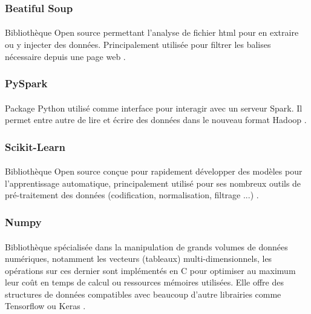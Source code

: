 		\subsubsection*{Beatiful Soup}
		\paragraph{}
		Bibliothèque Open source permettant l'analyse de fichier html pour en extraire ou y injecter des données. Principalement utilisée pour filtrer les balises nécessaire depuis une page web \cite{bs4}.
		
		\subsubsection*{PySpark}
		\paragraph{}
		Package Python utilisé comme interface pour interagir avec un serveur Spark. Il permet entre autre de lire et écrire des données dans le nouveau format Hadoop \cite{pyspark}.
		
		\subsubsection*{Scikit-Learn}
		\paragraph{}
		Bibliothèque Open source conçue pour rapidement développer des modèles pour l'apprentissage automatique, principalement utilisé pour ses nombreux outils de pré-traitement des données (codification, normalisation, filtrage ...) \cite{sklearn}.
		
		\subsubsection*{Numpy}
		\paragraph{}
		Bibliothèque spécialisée dans la manipulation de grands volumes de données numériques, notamment les vecteurs (tableaux) multi-dimensionnels, les opérations sur ces dernier sont implémentés en C pour optimiser au maximum leur coût en temps de calcul ou ressources mémoires utilisées. Elle offre des structures de données compatibles avec beaucoup d'autre librairies comme Tensorflow ou Keras \cite{numpy}.
		
